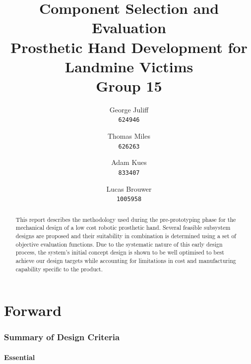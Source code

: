 \documentclass[11pt,3p]{report}
\begin{document}
\pagestyle{fancy}
\lhead{}

\title{
	\huge Component Selection and Evaluation\\
	\small Prosthetic Hand Development for Landmine Victims \\
	\vspace{0.5cm}
	\vspace{1cm}
	\large Group 15
}

\author{
	George Juliff\\
	\texttt{624946}
	\and
	Thomas Miles\\
	\texttt{626263}
	\and
	Adam Kues\\
	\texttt{833407}
	\and
	Lucas Brouwer\\
	\texttt{1005958}
}


\maketitle
\vspace{2cm}

\begin{abstract}
This report describes the methodology used during the pre-prototyping phase for the mechanical design of a low cost robotic prosthetic hand. Several feasible subsystem designs are proposed and their suitability in combination is determined using a set of objective evaluation functions. Due to the systematic nature of this early design process, the system's initial concept design is shown to be well optimised to best achieve our design targets while accounting for limitations in cost and manufacturing capability specific to the product.
\end{abstract}

\pagebreak

\tableofcontents

\pagebreak


\part{Forward}
\section{Summary of Design Criteria}
	\subsection{Essential}	\label{ess}
	
\end{document}
